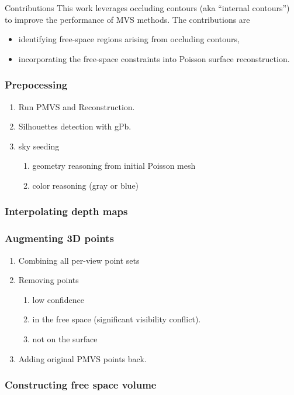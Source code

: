 \documentclass{article}
\begin{document}
Contributions
This work leverages occluding contours (aka “internal contours”) to improve the
performance of MVS methods. The contributions are
\begin{itemize}
	\item identifying free-space regions arising from occluding contours,
	\item incorporating the free-space constraints into Poisson surface reconstruction.	
\end{itemize}

\subsubsection*{Prepocessing}
\begin{enumerate}
	\item Run PMVS and Reconstruction.
	\item Silhouettes detection with gPb.
	\item sky seeding 
		\begin{enumerate}
			\item geometry reasoning from initial Poisson mesh
			\item color reasoning (gray or blue)
		\end{enumerate}
\end{enumerate}

\subsubsection*{Interpolating depth maps}

\subsubsection*{Augmenting 3D points}

\begin{enumerate}
	\item Combining all per-view point sets
	\item Removing points
	\begin{enumerate}
		\item low confidence
		\item in the free space (significant visibility conflict).
		\item not on the surface
	\end{enumerate}
	\item Adding original PMVS points back.
\end{enumerate}

\subsubsection*{Constructing free space volume}
\end{document}
